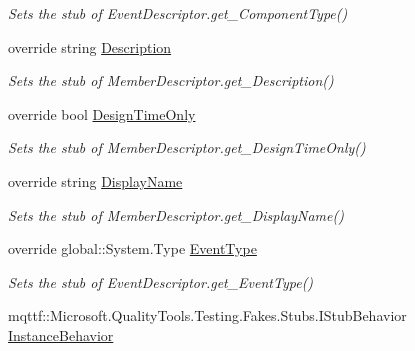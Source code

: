 \begin{DoxyCompactItemize}
\begin{DoxyCompactList}\small\item\em Sets the stub of Event\-Descriptor.\-get\-\_\-\-Component\-Type()\end{DoxyCompactList}\item 
override string \hyperlink{class_system_1_1_component_model_1_1_fakes_1_1_stub_event_descriptor_a5c06adf7ca8d153c261d182718a38573}{Description}
\begin{DoxyCompactList}\small\item\em Sets the stub of Member\-Descriptor.\-get\-\_\-\-Description()\end{DoxyCompactList}\item 
override bool \hyperlink{class_system_1_1_component_model_1_1_fakes_1_1_stub_event_descriptor_adf563c44f97bd8b864ef66396eee1d6f}{Design\-Time\-Only}
\begin{DoxyCompactList}\small\item\em Sets the stub of Member\-Descriptor.\-get\-\_\-\-Design\-Time\-Only()\end{DoxyCompactList}\item 
override string \hyperlink{class_system_1_1_component_model_1_1_fakes_1_1_stub_event_descriptor_a0c7e937a8e94b8bbbc7844e34084a16f}{Display\-Name}
\begin{DoxyCompactList}\small\item\em Sets the stub of Member\-Descriptor.\-get\-\_\-\-Display\-Name()\end{DoxyCompactList}\item 
override global\-::\-System.\-Type \hyperlink{class_system_1_1_component_model_1_1_fakes_1_1_stub_event_descriptor_ac8ab747c376096d2298f4d84d834a621}{Event\-Type}
\begin{DoxyCompactList}\small\item\em Sets the stub of Event\-Descriptor.\-get\-\_\-\-Event\-Type()\end{DoxyCompactList}\item 
mqttf\-::\-Microsoft.\-Quality\-Tools.\-Testing.\-Fakes.\-Stubs.\-I\-Stub\-Behavior \hyperlink{class_system_1_1_component_model_1_1_fakes_1_1_stub_event_descriptor_acf3fa5e853b89ac6dfb0ddba22cc33fd}{Instance\-Behavior}

\end{DoxyCompactItemize}
